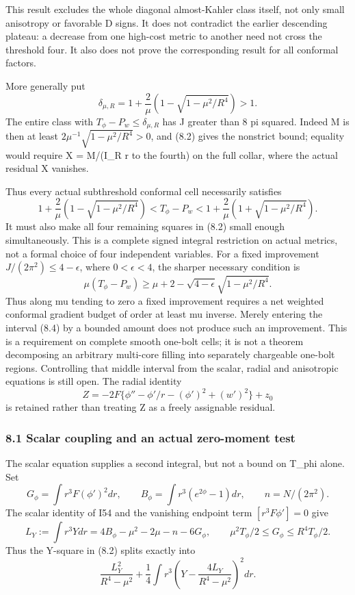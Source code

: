 \documentclass[
  10pt,
]{article}
\begin{document}
This result excludes the whole diagonal almost-Kahler class itself, not
only small anisotropy or favorable D signs. It does not contradict the
earlier descending plateau: a decrease from one high-cost metric to
another need not cross the threshold four. It also does not prove the
corresponding result for all conformal factors.

More generally put \[
 \delta_{\mu,R}=1+\frac2\mu
                  \left(1-\sqrt{1-\mu^2/R^4}\right)>1.
\] The entire class with \(T_\phi-P_w\le\delta_{\mu,R}\) has J greater
than 8 pi squared. Indeed M is then at least
\(2\mu^{-1}\sqrt{1-\mu^2/R^4}>0\), and (8.2) gives the nonstrict bound;
equality would require X = M/(I\_R r to the fourth) on the full collar,
where the actual residual X vanishes.

Thus every actual subthreshold conformal cell necessarily satisfies \[
 \boxed{1+\frac2\mu\left(1-\sqrt{1-\mu^2/R^4}\right)
 < T_\phi-P_w
 <1+\frac2\mu\left(1+\sqrt{1-\mu^2/R^4}\right).}         \tag{8.4}
\] It must also make all four remaining squares in (8.2) small enough
simultaneously. This is a complete signed integral restriction on actual
metrics, not a formal choice of four independent variables. For a fixed
improvement \(J/(2\pi^2)\le4-\epsilon\), where \(0<\epsilon<4\), the
sharper necessary condition is \[
 \mu(T_\phi-P_w)\ge
        \mu+2-\sqrt{4-\epsilon}\sqrt{1-\mu^2/R^4}.       \tag{8.5}
\] Thus along mu tending to zero a fixed improvement requires a net
weighted conformal gradient budget of order at least mu inverse. Merely
entering the interval (8.4) by a bounded amount does not produce such an
improvement. This is a requirement on complete smooth one-bolt cells; it
is not a theorem decomposing an arbitrary multi-core filling into
separately chargeable one-bolt regions. Controlling that middle interval
from the scalar, radial and anisotropic equations is still open. The
radial identity \[
 Z=-2F\{\phi''-\phi'/r-(\phi')^2+(w')^2\}+z_0
\] is retained rather than treating Z as a freely assignable residual.

\hypertarget{scalar-coupling-and-an-actual-zero-moment-test}{%
\subsubsection{8.1 Scalar coupling and an actual zero-moment
test}\label{scalar-coupling-and-an-actual-zero-moment-test}}

The scalar equation supplies a second integral, but not a bound on
T\_phi alone. Set \[
 G_\phi=\int r^3F(\phi')^2dr,\qquad
 B_\phi=\int r^3(e^{2\phi}-1)dr,\qquad n=N/(2\pi^2).
\] The scalar identity of I54 and the vanishing endpoint term
\([r^3F\phi']=0\) give \[
 L_Y:=\int r^3Ydr=4B_\phi-\mu^2-2\mu-n-6G_\phi,
 \qquad \mu^2T_\phi/2\le G_\phi\le R^4T_\phi/2.         \tag{8.6}
\] Thus the Y-square in (8.2) splits exactly into \[
 \frac{L_Y^2}{R^4-\mu^2}
 +\frac14\int r^3
           \left(Y-\frac{4L_Y}{R^4-\mu^2}\right)^2dr.    \tag{8.7}
\]
\end{document}
